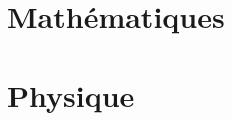 \documentclass{formulaire}
\begin{document}

\clearpage

\part{Mathématiques}


\part{Physique}

\end{document}

